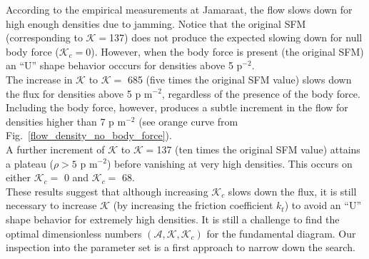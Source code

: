 \documentclass[preprint,12pt]{elsarticle}
\begin{document}
According to the empirical measurements at Jamaraat, the flow slows down for
high enough densities due to jamming. Notice that the original SFM
(corresponding to $\mathcal{K}=$137) does not produce the expected slowing down
for null body force ($\mathcal{K}_c=$0). However, when the body force is present
(the original SFM) an ``U'' shape behavior occcurs for densities above 5
p$^{-2}$.\\

The increase in $\mathcal{K}$ to $\mathcal{K} = $ 685 (five times the original
SFM value) slows down  the flux for densities above 5 p m$^{-2}$, regardless of
the presence of the body force. Including the body force, however, produces a
subtle increment in the flow for densities higher than 7 p m$^{-2}$ (see orange
curve from Fig.~\ref{flow_density_no_body_force}). \\

A further increment of $\mathcal{K}$ to $\mathcal{K}=$137 (ten times the 
original SFM value) attains a plateau ($\rho>5$ p m$^{-2}$) before vanishing at 
very high densities. This occurs on either $\mathcal{K}_c=$ 0 and 
$\mathcal{K}_c = $ 68.\\


These results suggest that although increasing $\mathcal{K}_c$ slows down the
flux, it is still necessary to increase $\mathcal{K}$ (by increasing the
friction coefficient $k_t$) to avoid an ``U'' shape behavior for extremely high
densities. It is still a challenge to find the optimal dimensionless numbers
$(\mathcal{A},\mathcal{K},\mathcal{K}_c)$ for the fundamental diagram. Our
inspection into the parameter set is a first approach to narrow down the
search.\\
\end{document}
